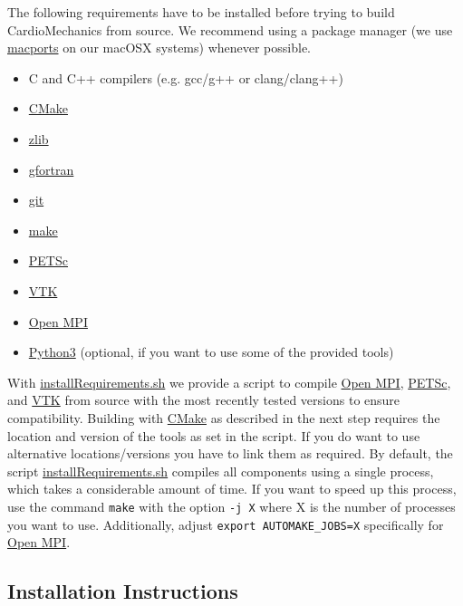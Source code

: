 The following requirements have to be installed before trying to build CardioMechanics from source.
We recommend using a package manager (we use \href{https://www.macports.org}{macports} on our macOSX systems) whenever possible.
\begin{itemize}
    \item C and C++ compilers (e.g. gcc/g++ or clang/clang++)
    \item \href{https://cmake.org}{CMake}
    \item \href{https://zlib.net}{zlib}
    \item \href{https://gcc.gnu.org/fortran/}{gfortran}
    \item \href{https://git-scm.com}{git}
    \item \href{https://git-scm.com}{make}
    \item \href{https://www.mcs.anl.gov/petsc/}{PETSc}
    \item \href{https://vtk.org}{VTK}
    \item \href{https://www.open-mpi.org}{Open MPI}
    \item \href{https://www.python.org}{Python3} (optional, if you want to use some of the provided tools)
\end{itemize}
With \href{https://github.com/KIT-IBT/CardioMechanics/blob/main/installRequirements.sh}{installRequirements.sh} we provide a script to compile \href{https://www.open-mpi.org}{Open MPI}, \href{https://www.mcs.anl.gov/petsc/}{PETSc}, and \href{https://vtk.org}{VTK} from source with the most recently tested versions to ensure compatibility.
Building with \href{https://cmake.org}{CMake} as described in the next step requires the location and version of the tools as set in the script.
If you do want to use alternative locations/versions you have to link them as required.
By default, the script \href{https://github.com/KIT-IBT/CardioMechanics/blob/main/installRequirements.sh}{installRequirements.sh} compiles all components using a single process, which takes a considerable amount of time.
If you want to speed up this process, use the command \verb|make| with the option \verb|-j X| where X is the number of processes you want to use.
Additionally, adjust \verb|export AUTOMAKE_JOBS=X| specifically for \href{https://www.open-mpi.org}{Open MPI}.

\subsection{Installation Instructions}

